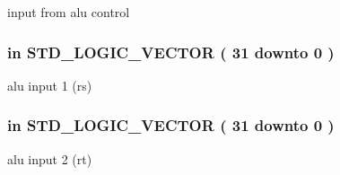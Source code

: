 input from alu control 

\hypertarget{class_a_l_u_a914f203651b8887062dd7432ef37b92a}{
\subsubsection[{A\-L\-U\-\_\-\-Input\-\_\-1}]{ {\bfseries \textcolor{vhdlkeyword}{in}\textcolor{vhdlchar}{ }} {\bfseries \textcolor{comment}{S\-T\-D\-\_\-\-L\-O\-G\-I\-C\-\_\-\-V\-E\-C\-T\-O\-R}\textcolor{vhdlchar}{ }\textcolor{vhdlchar}{(}\textcolor{vhdlchar}{ }\textcolor{vhdlchar}{ } \textcolor{vhdldigit}{31} \textcolor{vhdlchar}{ }\textcolor{vhdlchar}{ }\textcolor{vhdlchar}{ }\textcolor{vhdlkeyword}{downto}\textcolor{vhdlchar}{ }\textcolor{vhdlchar}{ }\textcolor{vhdlchar}{ } \textcolor{vhdldigit}{0} \textcolor{vhdlchar}{ }\textcolor{vhdlchar}{)}\textcolor{vhdlchar}{ }} \hspace{0.3cm}{\ttfamily [Port]}}}\label{class_a_l_u_a914f203651b8887062dd7432ef37b92a}


alu input 1 (rs) 

\hypertarget{class_a_l_u_aa3b3b0b101b8269e00ade1a474bb35e0}{
\subsubsection[{A\-L\-U\-\_\-\-Input\-\_\-2}]{ {\bfseries \textcolor{vhdlkeyword}{in}\textcolor{vhdlchar}{ }} {\bfseries \textcolor{comment}{S\-T\-D\-\_\-\-L\-O\-G\-I\-C\-\_\-\-V\-E\-C\-T\-O\-R}\textcolor{vhdlchar}{ }\textcolor{vhdlchar}{(}\textcolor{vhdlchar}{ }\textcolor{vhdlchar}{ } \textcolor{vhdldigit}{31} \textcolor{vhdlchar}{ }\textcolor{vhdlchar}{ }\textcolor{vhdlchar}{ }\textcolor{vhdlkeyword}{downto}\textcolor{vhdlchar}{ }\textcolor{vhdlchar}{ }\textcolor{vhdlchar}{ } \textcolor{vhdldigit}{0} \textcolor{vhdlchar}{ }\textcolor{vhdlchar}{)}\textcolor{vhdlchar}{ }} \hspace{0.3cm}{\ttfamily [Port]}}}\label{class_a_l_u_aa3b3b0b101b8269e00ade1a474bb35e0}


alu input 2 (rt) 

